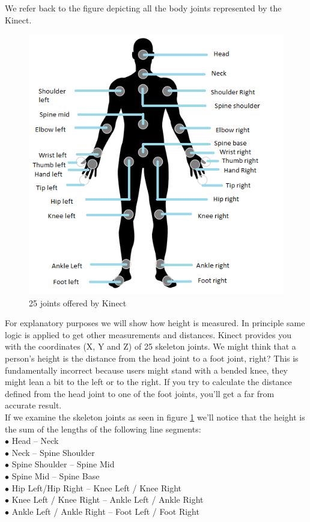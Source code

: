 \noindent We refer back to the figure depicting all the body joints represented by the Kinect.\\
\begin{figure}[h]
\centering
\includegraphics[scale=0.85]{Figbodjoints.png}
\caption{25 joints offered by Kinect}
\label{fig:Figbodjoints.png}
\end{figure}
\noindent For explanatory purposes we will show how height is measured. In principle same logic is applied to get other measurements and distances.
Kinect provides you with the coordinates (X, Y and Z) of 25 skeleton joints. We might think that a person's height is the distance from the head joint to a foot joint, right? This is fundamentally incorrect because users might stand with a bended knee, they might lean a bit to the left or to the right. If you try to calculate the distance defined from the head joint to one of the foot joints, you'll get a far from accurate result.\\

\noindent If we examine the skeleton joints as seen in figure \ref{fig:Figbodjoints.png} we'll notice that the height is the sum of the lengths of the following line segments:\\
\noindent$\bullet$   Head – Neck\\
$\bullet$	Neck – Spine Shoulder\\
$\bullet$	Spine Shoulder – Spine Mid\\
$\bullet$	Spine Mid – Spine Base\\
$\bullet$	Hip Left/Hip Right – Knee Left / Knee Right\\
$\bullet$	Knee Left / Knee Right – Ankle Left / Ankle Right\\
$\bullet$	Ankle Left / Ankle Right – Foot Left / Foot Right\\

